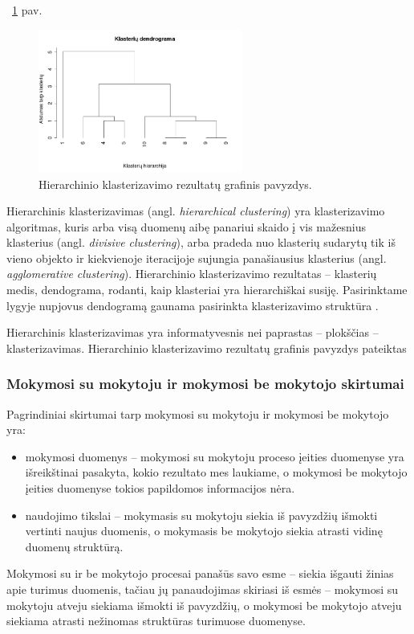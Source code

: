 ~\ref{fig:hierarchical_clustering} pav.
\begin{figure}
 \centering
 \includegraphics[width=0.6\textwidth]{images/hierarchical_clustering.png}
 \caption{Hierarchinio klasterizavimo rezultatų grafinis pavyzdys.}
 \label{fig:hierarchical_clustering}
\end{figure}
Hierarchinis klasterizavimas (angl. \textit{hierarchical clustering}) yra klasterizavimo algoritmas, kuris arba visą duomenų aibę panariui skaido į vis mažesnius klasterius (angl. \textit{divisive clustering}), arba pradeda nuo klasterių sudarytų tik iš vieno objekto ir kiekvienoje iteracijoje sujungia panašiausius klasterius (angl. \textit{agglomerative clustering}).  Hierarchinio klasterizavimo rezultatas -- klasterių medis, dendograma, rodanti, kaip klasteriai yra hierarchiškai susiję. Pasirinktame lygyje nupjovus dendogramą gaunama pasirinkta klasterizavimo struktūra \cite{martisiute08}. 

Hierarchinis klasterizavimas yra informatyvesnis nei paprastas -- plokščias -- klasterizavimas. Hierarchinio klasterizavimo rezultatų grafinis pavyzdys pateiktas 

\subsubsection{Mokymosi su mokytoju ir mokymosi be mokytojo skirtumai}

 Pagrindiniai skirtumai tarp mokymosi su mokytoju ir mokymosi be mokytojo yra:
\begin{itemize}
  \item mokymosi duomenys -- mokymosi su mokytoju proceso įeities duomenyse yra išreikštinai pasakyta, kokio rezultato mes laukiame, o mokymosi be mokytojo įeities duomenyse tokios papildomos informacijos nėra.
  \item  naudojimo tikslai -- mokymasis su mokytoju siekia iš pavyzdžių išmokti vertinti naujus duomenis, o mokymasis be mokytojo siekia atrasti vidinę duomenų struktūrą.
\end{itemize}
Mokymosi su ir be mokytojo procesai panašūs savo esme -- siekia išgauti žinias apie turimus duomenis, tačiau jų panaudojimas skiriasi iš esmės -- mokymosi su mokytoju atveju siekiama išmokti iš pavyzdžių, o mokymosi be mokytojo atveju siekiama atrasti nežinomas struktūras turimuose duomenyse.

